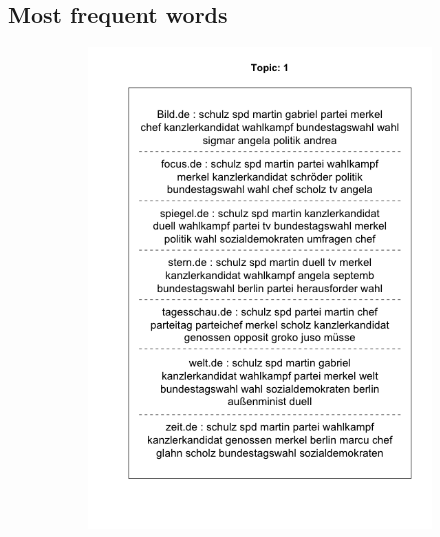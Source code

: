 \documentclass[12pt,a4paper,notitlepage]{article}
\begin{document}
\subsection{Most frequent words}\label{apx_tf}
\begin{figure}[H]
	\begin{center}
		\begin{subfigure}[normla]{0.49\textwidth}
			\includegraphics[width=\textwidth]{figs/plotquote1.png}
		\end{subfigure}
		\begin{subfigure}[normla]{0.49\textwidth}

\end{subfigure}
\end{center}
\end{figure}
\end{document}
